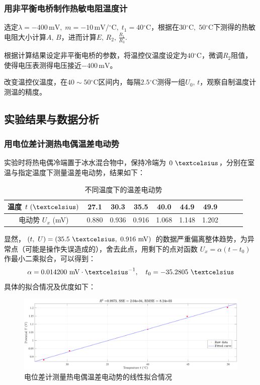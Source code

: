 \documentclass[UTF8]{article}
\theoremstyle{MyLineTheoremStyle} %
\theoremstyle{MyBlockTheoremStyle} %
\theoremstyle{MySubsubsectionStyle} %
\begin{document}
\subsubsection{用非平衡电桥制作热敏电阻温度计}
选定$ \lambda = -400\,\mathrm{mV},\; m=-10\,\mathrm{mV/\mathrm{^\circ C}},\; t_1=40\mathrm{^\circ C} $，根据在$ 30\mathrm{^\circ C},\;50\mathrm{^\circ C} $下测得的热敏电阻大小计算$ A,\,B $，进而计算$ E,\,R_2,\,\frac{R_1}{R_3} $.

根据计算结果设定非平衡电桥的参数，将温控仪温度设定为$ 40\mathrm{^\circ C} $，微调$ R_2 $阻值，使得电压表测得电压接近$ -400\,\mathrm{mV} $。

改变温控仪温度，在$ 40\sim 50\mathrm{^\circ C} $区间内，每隔$ 2.5\mathrm{^\circ C} $测得一组$ U_0,\,t $，观察自制温度计测温的精度。

\subsection{实验结果与数据分析}

\subsubsection{用电位差计测热电偶温差电动势}
实验时将热电偶冷端置于冰水混合物中，保持冷端为 $0\  \textcelsius$，分别在室温与指定温度下测量温差电动势，结果如下：
\begin{table}[H]\centering
    \caption{不同温度下的温差电动势}
    \label{不同温度下的温差电动势}
\begin{tabular}{cccccccccc}\toprule
    温度 $t\ ( \textcelsius)$  & 27.1 & 30.3 & 35.5 & 40.0 & 44.9 & 49.9  \\
    \midrule
    电动势 $U_x $ (mV) & 0.880 & 0.936 & 0.916 & 1.068 & 1.148 & 1.202 \\
    \bottomrule
\end{tabular}
\end{table}
显然，$(t,\ U) = (35.5\  \textcelsius,\ 0.916\ \mathrm{mV})$ 的数据严重偏离整体趋势，为异常点（可能是操作失误造成的），舍去此点，用剩下的点对函数 $U_x = \alpha \left(t - t_0\right)$ 作最小二乘拟合，可以得到：
\begin{equation}
\alpha = 0.014200 \ \mathrm{mV \cdot \textcelsius^{-1}},\quad t_0 = -35.2805 \ \mathrm{\textcelsius}
\end{equation}
具体的拟合情况及优度如下：
\begin{figure}[H]\centering
    \includegraphics[width=\columnwidth]{assets/温差电动势.pdf}
    \caption{电位差计测量热电偶温差电动势的线性拟合情况}
\end{figure}
\end{document}
